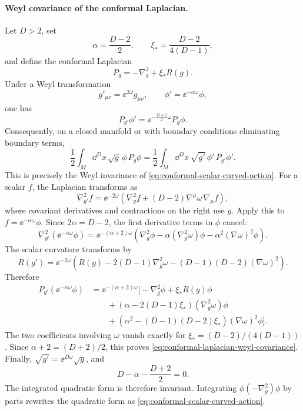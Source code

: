 \paragraph{Weyl covariance of the conformal Laplacian.}
Let \(D>2\), set
\[
  \alpha=\frac{D-2}{2},
  \qquad
  \xi_\ast=\frac{D-2}{4(D-1)},
\]
and define the conformal Laplacian
\[
  P_g=-\nabla_g^2+\xi_\ast R(g).
\]
Under a Weyl transformation
\[
  g'_{\mu\nu}=\ee^{2\omega}g_{\mu\nu},
  \qquad
  \phi'=\ee^{-\alpha\omega}\phi,
\]
one has
\begin{equation}
  P_{g'}\phi'
  =
  \ee^{-\frac{D+2}{2}\omega}P_g\phi .
  \label{eq:conformal-laplacian-weyl-covariance}
\end{equation}
Consequently, on a closed manifold or with boundary conditions eliminating
boundary terms,
\[
  \frac12\int_M\dd^D x\,\sqrt g\,
  \phi\,P_g\phi
  =
  \frac12\int_M\dd^D x\,\sqrt{g'}\,
  \phi'\,P_{g'}\phi' .
\]
This is precisely the Weyl invariance of
\eqref{eq:conformal-scalar-curved-action}.
For a scalar \(f\), the Laplacian transforms as
\[
  \nabla_{g'}^2f
  =
  \ee^{-2\omega}
  \left(
    \nabla_g^2f
    +(D-2)\nabla^\mu\omega\,\nabla_\mu f
  \right),
\]
where covariant derivatives and contractions on the right use \(g\).  Apply
this to \(f=\ee^{-\alpha\omega}\phi\).  Since \(2\alpha=D-2\), the first
derivative terms in \(\phi\) cancel:
\[
  \nabla_{g'}^2(\ee^{-\alpha\omega}\phi)
  =
  \ee^{-(\alpha+2)\omega}
  \left(
    \nabla_g^2\phi
    -\alpha(\nabla_g^2\omega)\phi
    -\alpha^2(\nabla\omega)^2\phi
  \right).
\]
The scalar curvature transforms by
\[
  R(g')
  =
  \ee^{-2\omega}
  \left(
    R(g)-2(D-1)\nabla_g^2\omega
    -(D-1)(D-2)(\nabla\omega)^2
  \right).
\]
Therefore
\[
\begin{aligned}
  P_{g'}(\ee^{-\alpha\omega}\phi)
  &=
  \ee^{-(\alpha+2)\omega}
  \bigl[
    -\nabla_g^2\phi
    +\xi_\ast R(g)\phi
\\
  &\qquad
    +(\alpha-2(D-1)\xi_\ast)(\nabla_g^2\omega)\phi
\\
  &\qquad
    +(\alpha^2-(D-1)(D-2)\xi_\ast)(\nabla\omega)^2\phi
  \bigr].
\end{aligned}
\]
The two coefficients involving \(\omega\) vanish exactly for
\(\xi_\ast=(D-2)/(4(D-1))\).  Since \(\alpha+2=(D+2)/2\), this proves
\eqref{eq:conformal-laplacian-weyl-covariance}.  Finally,
\(\sqrt{g'}=\ee^{D\omega}\sqrt g\), and
\[
  D-\alpha-\frac{D+2}{2}=0.
\]
The integrated quadratic form is therefore invariant.  Integrating
\(\phi(-\nabla_g^2)\phi\) by parts rewrites the quadratic form as
\eqref{eq:conformal-scalar-curved-action}.

